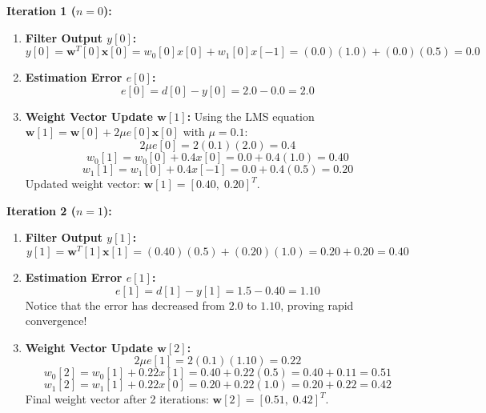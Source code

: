 \documentclass[11pt,a4paper]{article}
\begin{document}
\noindent\textbf{Iteration 1 ($n = 0$):}
\begin{enumerate}
    \item \textbf{Filter Output $y[0]$:}
    \begin{equation}
    y[0] = \mathbf{w}^T[0] \mathbf{x}[0] = w_0[0] x[0] + w_1[0] x[-1] = (0.0)(1.0) + (0.0)(0.5) = \mathbf{0.0}
    \end{equation}
    \item \textbf{Estimation Error $e[0]$:}
    \begin{equation}
    e[0] = d[0] - y[0] = 2.0 - 0.0 = \mathbf{2.0}
    \end{equation}
    \item \textbf{Weight Vector Update $\mathbf{w}[1]$:}
    Using the LMS equation $\mathbf{w}[1] = \mathbf{w}[0] + 2\mu e[0] \mathbf{x}[0]$ with $\mu = 0.1$:
    \begin{equation}
    2\mu e[0] = 2(0.1)(2.0) = 0.4
    \end{equation}
    \begin{equation}
    w_0[1] = w_0[0] + 0.4 x[0] = 0.0 + 0.4(1.0) = \mathbf{0.40}
    \end{equation}
    \begin{equation}
    w_1[1] = w_1[0] + 0.4 x[-1] = 0.0 + 0.4(0.5) = \mathbf{0.20}
    \end{equation}
    Updated weight vector: $\mathbf{w}[1] = [0.40, \; 0.20]^T$.
\end{enumerate}

\noindent\textbf{Iteration 2 ($n = 1$):}
\begin{enumerate}
    \item \textbf{Filter Output $y[1]$:}
    \begin{equation}
    y[1] = \mathbf{w}^T[1] \mathbf{x}[1] = (0.40)(0.5) + (0.20)(1.0) = 0.20 + 0.20 = \mathbf{0.40}
    \end{equation}
    \item \textbf{Estimation Error $e[1]$:}
    \begin{equation}
    e[1] = d[1] - y[1] = 1.5 - 0.40 = \mathbf{1.10}
    \end{equation}
    Notice that the error has decreased from $2.0$ to $1.10$, proving rapid convergence!
    \item \textbf{Weight Vector Update $\mathbf{w}[2]$:}
    \begin{equation}
    2\mu e[1] = 2(0.1)(1.10) = 0.22
    \end{equation}
    \begin{equation}
    w_0[2] = w_0[1] + 0.22 x[1] = 0.40 + 0.22(0.5) = 0.40 + 0.11 = \mathbf{0.51}
    \end{equation}
    \begin{equation}
    w_1[2] = w_1[1] + 0.22 x[0] = 0.20 + 0.22(1.0) = 0.20 + 0.22 = \mathbf{0.42}
    \end{equation}
    Final weight vector after 2 iterations: $\mathbf{w}[2] = [0.51, \; 0.42]^T$.
\end{enumerate}
\end{document}
